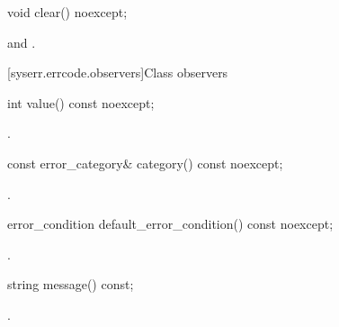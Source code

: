 \begin{itemdecl}
void clear() noexcept;
\end{itemdecl}

\begin{itemdescr}
\pnum
\postconditions {} and .
\end{itemdescr}


[syserr.errcode.observers]{Class  observers}

\begin{itemdecl}
int value() const noexcept;
\end{itemdecl}

\begin{itemdescr}
\pnum
\returns {}.
\end{itemdescr}

\begin{itemdecl}
const error_category& category() const noexcept;
\end{itemdecl}

\begin{itemdescr}
\pnum
\returns {}.
\end{itemdescr}

\begin{itemdecl}
error_condition default_error_condition() const noexcept;
\end{itemdecl}

\begin{itemdescr}
\pnum
\returns {}.
\end{itemdescr}

\begin{itemdecl}
string message() const;
\end{itemdecl}

\begin{itemdescr}
\pnum
\returns {}.
\end{itemdescr}

